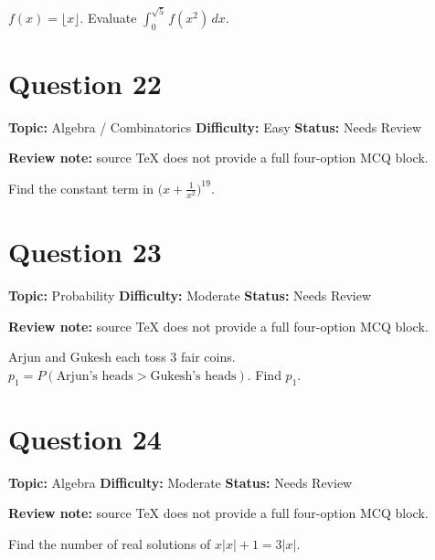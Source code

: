 \documentclass[11pt]{article}
\begin{document}
$f(x)=\lfloor x\rfloor$. Evaluate $\displaystyle\int_0^{\sqrt 5}f(x^2)\,dx$.

\newpage

\section*{Question 22}


\noindent\textbf{Topic:} Algebra / Combinatorics \quad \textbf{Difficulty:} Easy \quad \textbf{Status:} Needs Review

\par\noindent\textcolor{StatAmber}{\textbf{Review note:} source TeX does not provide a full four-option MCQ block.}


Find the constant term in $\bigl(x+\tfrac{1}{x^2}\bigr)^{19}$.

\newpage

\section*{Question 23}


\noindent\textbf{Topic:} Probability \quad \textbf{Difficulty:} Moderate \quad \textbf{Status:} Needs Review

\par\noindent\textcolor{StatAmber}{\textbf{Review note:} source TeX does not provide a full four-option MCQ block.}


Arjun and Gukesh each toss 3 fair coins. $p_1=P(\text{Arjun's heads}>\text{Gukesh's heads})$. Find $p_1$.

\newpage

\section*{Question 24}


\noindent\textbf{Topic:} Algebra \quad \textbf{Difficulty:} Moderate \quad \textbf{Status:} Needs Review

\par\noindent\textcolor{StatAmber}{\textbf{Review note:} source TeX does not provide a full four-option MCQ block.}


Find the number of real solutions of $x|x|+1=3|x|$.

\newpage
\end{document}
